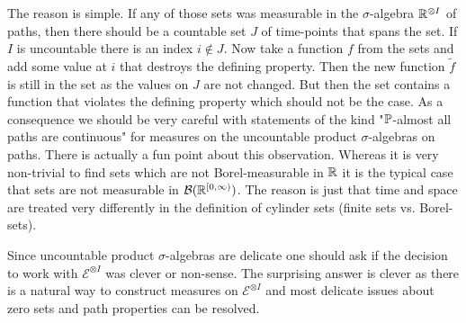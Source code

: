 The reason is simple. If any of those sets was measurable in the $\sigma$-algebra $\R^{\otimes I}$ of paths, then there should be a countable set $J$ of time-points that spans the set. If $I$ is uncountable there is an index $i\notin J$. Now take a function $f$ from the sets and add some value at $i$ that destroys the defining property. Then the new function $\tilde f$ is still in the set as the values on $J$ are not changed. But then the set contains a function that violates the defining property which should not be the case. As a consequence we should be very careful with statements of the kind "{}$\P$-almost all paths are continuous"{} for measures on the uncountable product $\sigma$-algebras on paths. There is actually a fun point about this observation. Whereas it is very non-trivial to find sets which are not Borel-measurable in $\R$ it is the typical case that sets are not measurable in $\mathcal B(\R^{[0,\infty)})$. The reason is just that time and space are treated very differently in the definition of cylinder sets (finite sets vs. Borel-sets).\smallskip

Since uncountable product $\sigma$-algebras are delicate one should ask if the decision to work with $\mathcal E^{\otimes I}$ was clever or non-sense. The surprising answer is clever as there is a natural way to construct measures on $\mathcal E^{\otimes I}$ and most delicate issues about zero sets and path properties can be resolved.
\marginpar{\textcolor{red}{Lecture 20}}

